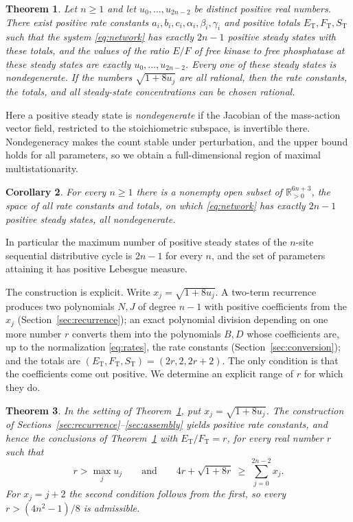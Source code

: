 \documentclass[11pt]{article}
\theoremstyle{plain}
\newtheorem{theorem}{Theorem}[section]
\newtheorem{corollary}[theorem]{Corollary}
\theoremstyle{definition}
\theoremstyle{remark}
\numberwithin{equation}{section}
\newcommand{\R}{\mathbb R}
\newcommand{\ET}{E_{\mathrm T}}
\newcommand{\FT}{F_{\mathrm T}}
\newcommand{\ST}{S_{\mathrm T}}
\begin{document}
\begin{theorem}\label{thm:main}
Let \(n\ge1\) and let \(u_0,\dots,u_{2n-2}\) be distinct positive real numbers. There exist
positive rate constants \(a_i,b_i,c_i,\alpha_i,\beta_i,\gamma_i\) and positive totals
\(\ET,\FT,\ST\) such that the system \eqref{eq:network} has exactly \(2n-1\) positive steady
states with these totals, and the values of the ratio \(E/F\) of free kinase to free
phosphatase at these steady states are exactly \(u_0,\dots,u_{2n-2}\). Every one of these
steady states is nondegenerate. If the numbers \(\sqrt{1+8u_j}\) are all rational, then the
rate constants, the totals, and all steady-state concentrations can be chosen rational.
\end{theorem}

Here a positive steady state is \emph{nondegenerate} if the Jacobian of the mass-action vector
field, restricted to the stoichiometric subspace, is invertible there. Nondegeneracy makes the
count stable under perturbation, and the upper bound holds for all parameters, so we obtain a
full-dimensional region of maximal multistationarity.

\begin{corollary}\label{cor:open}
For every \(n\ge1\) there is a nonempty open subset of \(\R^{6n+3}_{>0}\), the space of all rate
constants and totals, on which \eqref{eq:network} has exactly \(2n-1\) positive steady states,
all nondegenerate.
\end{corollary}

In particular the maximum number of positive steady states of the \(n\)-site sequential
distributive cycle is \(2n-1\) for every \(n\), and the set of parameters attaining it has
positive Lebesgue measure.

The construction is explicit. Write \(x_j=\sqrt{1+8u_j}\). A two-term recurrence produces two
polynomials \(N,J\) of degree \(n-1\) with positive coefficients from the \(x_j\)
(Section~\ref{sec:recurrence}); an exact polynomial division depending on one more number
\(r\) converts them into the polynomials \(B,D\) whose coefficients are, up to the
normalization \eqref{eq:rates}, the rate constants (Section~\ref{sec:conversion}); and the
totals are \((\ET,\FT,\ST)=(2r,2,2r+2)\). The only condition is that the coefficients come out
positive. We determine an explicit range of \(r\) for which they do.

\begin{theorem}\label{thm:threshold}
In the setting of Theorem~\ref{thm:main}, put \(x_j=\sqrt{1+8u_j}\). The construction of
Sections~\ref{sec:recurrence}--\ref{sec:assembly} yields positive rate constants, and hence
the conclusions of Theorem~\ref{thm:main} with \(\ET/\FT=r\), for every real number \(r\) such
that
\begin{equation}\label{eq:rcondition}
 r>\max_j u_j\qquad\text{and}\qquad 4r+\sqrt{1+8r}\ \ge\ \sum_{j=0}^{2n-2}x_j .
\end{equation}
For \(x_j=j+2\) the second condition follows from the first, so every
\(r>(4n^2-1)/8\) is admissible.
\end{theorem}
\end{document}

